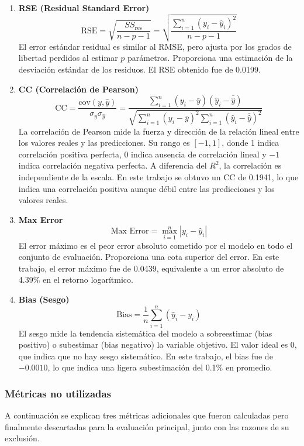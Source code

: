 \documentclass[12pt,a4paper]{article}
\begin{document}
\begin{enumerate}[leftmargin=*,labelindent=0em]
    \item \textbf{RSE (Residual Standard Error)} \[
    \text{RSE} = \sqrt{\frac{SS_{\text{res}}}{n-p-1}} = \sqrt{\frac{\sum_{i=1}^{n}(y_i - \hat{y}_i)^2}{n-p-1}}
    \]
    El error estándar residual es similar al RMSE, pero ajusta por los grados de libertad perdidos al estimar $p$ parámetros. Proporciona una estimación de la desviación estándar de los residuos. El RSE obtenido fue de 0.0199.

    \item \textbf{CC (Correlación de Pearson)} \[
    \text{CC} = \frac{\text{cov}(y, \hat{y})}{\sigma_y \sigma_{\hat{y}}} = \frac{\sum_{i=1}^{n}(y_i - \bar{y})(\hat{y}_i - \bar{\hat{y}})}{\sqrt{\sum_{i=1}^{n}(y_i - \bar{y})^2 \sum_{i=1}^{n}(\hat{y}_i - \bar{\hat{y}})^2}}
    \]
    La correlación de Pearson mide la fuerza y dirección de la relación lineal entre los valores reales y las predicciones. Su rango es $[-1, 1]$, donde 1 indica correlación positiva perfecta, 0 indica ausencia de correlación lineal y $-1$ indica correlación negativa perfecta. A diferencia del $R^{2}$, la correlación es independiente de la escala. En este trabajo se obtuvo un CC de 0.1941, lo que indica una correlación positiva aunque débil entre las predicciones y los valores reales.

    \item \textbf{Max Error} \[
    \text{Max Error} = \max_{i=1}^{n} |y_i - \hat{y}_i|
    \]
    El error máximo es el peor error absoluto cometido por el modelo en todo el conjunto de evaluación. Proporciona una cota superior del error. En este trabajo, el error máximo fue de 0.0439, equivalente a un error absoluto de 4.39\% en el retorno logarítmico.

    \item \textbf{Bias (Sesgo)} \[
    \text{Bias} = \frac{1}{n}\sum_{i=1}^{n}(\hat{y}_i - y_i)
    \]
    El sesgo mide la tendencia sistemática del modelo a sobreestimar (bias positivo) o subestimar (bias negativo) la variable objetivo. El valor ideal es 0, que indica que no hay sesgo sistemático. En este trabajo, el bias fue de $-0.0010$, lo que indica una ligera subestimación del 0.1\% en promedio.

\end{enumerate}

\subsubsection{Métricas no utilizadas}

A continuación se explican tres métricas adicionales que fueron calculadas pero finalmente descartadas para la evaluación principal, junto con las razones de su exclusión.
\end{document}
